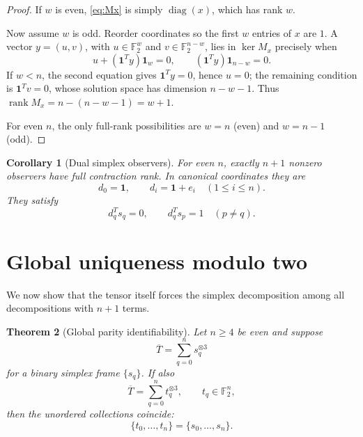 \documentclass[11pt]{article}
\newtheorem{theorem}{Theorem}
\newtheorem{corollary}[theorem]{Corollary}
\theoremstyle{definition}
\newcommand{\F}{\mathbb{F}}
\newcommand{\one}{\mathbf{1}}
\newcommand{\rank}{\operatorname{rank}}
\begin{document}
\begin{proof}
If $w$ is even, \eqref{eq:Mx} is simply $\operatorname{diag}(x)$, which has rank $w$.

Now assume $w$ is odd. Reorder coordinates so the first $w$ entries of $x$ are $1$. A vector $y=(u,v)$, with $u\in\F_2^w$ and $v\in\F_2^{n-w}$, lies in $\ker M_x$ precisely when
\[
u+(\one^T y)\one_w=0,\qquad (\one^T y)\one_{n-w}=0.
\]
If $w<n$, the second equation gives $\one^T y=0$, hence $u=0$; the remaining condition is $\one^T v=0$, whose solution space has dimension $n-w-1$. Thus $\rank M_x=n-(n-w-1)=w+1$.

For even $n$, the only full-rank possibilities are $w=n$ (even) and $w=n-1$ (odd).
\end{proof}

\begin{corollary}[Dual simplex observers]\label{cor:dual}
For even $n$, exactly $n+1$ nonzero observers have full contraction rank. In canonical coordinates they are
\[
d_0=\one,\qquad d_i=\one+e_i\quad(1\le i\le n).
\]
They satisfy
\[
d_q^T s_q=0,\qquad d_q^T s_p=1\quad(p\ne q).
\]
\end{corollary}

\section{Global uniqueness modulo two}
We now show that the tensor itself forces the simplex decomposition among all decompositions with $n+1$ terms.

\begin{theorem}[Global parity identifiability]\label{thm:parity}
Let $n\ge 4$ be even and suppose
\[
\overline{T}=\sum_{q=0}^{n} s_q^{\otimes 3}
\]
for a binary simplex frame $\{s_q\}$. If also
\[
\overline{T}=\sum_{q=0}^{n} t_q^{\otimes 3},\qquad t_q\in\F_2^n,
\]
then the unordered collections coincide:
\[
\{t_0,\ldots,t_n\}=\{s_0,\ldots,s_n\}.
\]
\end{theorem}
\end{document}
